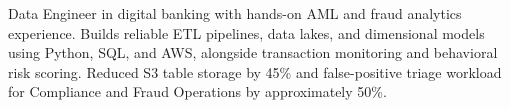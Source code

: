 
\begin{cvparagraph}
Data Engineer in digital banking with hands-on AML and fraud analytics experience. Builds reliable ETL pipelines, data lakes, and dimensional models using Python, SQL, and AWS, alongside transaction monitoring and behavioral risk scoring. Reduced S3 table storage by 45\% and false-positive triage workload for Compliance and Fraud Operations by approximately 50\%.
\end{cvparagraph}
